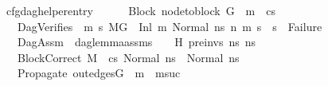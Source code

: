 \begin{isabellebody}
\isamarkupfalse%
%
\endisatagproof
{\isafoldproof}%
%
\isadelimproof
\isanewline
%
\endisadelimproof
\isanewline
{}\isamarkupfalse%
\ cfg{\isacharunderscore}{\kern0pt}dag{\isacharunderscore}{\kern0pt}helper{\isacharunderscore}{\kern0pt}entry{\isacharcolon}{\kern0pt}\isanewline
\ \ \isanewline
\ \ \ Block{\isacharcolon}{\kern0pt}\ {\isachardoublequoteopen}node{\isacharunderscore}{\kern0pt}to{\isacharunderscore}{\kern0pt}block\ G{}\ {\isacharbang}{\kern0pt}\ m{}\ {\isacharequal}{\kern0pt}\ cs{}{\isachardoublequoteclose}\ \isanewline
\ \ \ DagVerifies{\isacharcolon}{\kern0pt}\ {\isachardoublequoteopen}{\isasymAnd}\ m{}{\isacharprime}{\kern0pt}\ s{}{\isacharprime}{\kern0pt}{\isachardot}{\kern0pt}\ {\isacharparenleft}{\kern0pt}M{\isacharcomma}{\kern0pt}{\isasymLambda}{\isacharcomma}{\kern0pt}{\isasymGamma}{\isacharcomma}{\kern0pt}{\isasymOmega}{\isacharcomma}{\kern0pt}G{}\ {\isasymturnstile}\ {\isacharparenleft}{\kern0pt}Inl\ m{}{\isacharcomma}{\kern0pt}\ Normal\ ns{}{\isacharparenright}{\kern0pt}\ {\isacharminus}{\kern0pt}n{\isasymrightarrow}{\isacharasterisk}{\kern0pt}\ {\isacharparenleft}{\kern0pt}m{}{\isacharprime}{\kern0pt}{\isacharcomma}{\kern0pt}\ s{}{\isacharprime}{\kern0pt}{\isacharparenright}{\kern0pt}{\isacharparenright}{\kern0pt}\ {\isasymLongrightarrow}\ s{}{\isacharprime}{\kern0pt}\ {\isasymnoteq}\ Failure{\isachardoublequoteclose}\ \isanewline
\ \ \ DagAssm{\isacharcolon}{\kern0pt}\ \ {\isachardoublequoteopen}dag{\isacharunderscore}{\kern0pt}lemma{\isacharunderscore}{\kern0pt}assms\ {\isasymLambda}\ {\isasymGamma}\ {\isasymOmega}\ H\ pre{\isacharunderscore}{\kern0pt}invs\ ns{}\ ns{}{\isachardoublequoteclose}\ \isanewline
\ \ \ BlockCorrect{\isacharcolon}{\kern0pt}\ {\isachardoublequoteopen}M{\isacharcomma}{\kern0pt}{\isasymLambda}{\isacharcomma}{\kern0pt}{\isasymGamma}{\isacharcomma}{\kern0pt}{\isasymOmega}\ {\isasymturnstile}\ {\isasymlangle}cs{}{\isacharcomma}{\kern0pt}\ Normal\ ns{}{\isasymrangle}\ {\isacharbrackleft}{\kern0pt}{\isasymrightarrow}{\isacharbrackright}{\kern0pt}\ Normal\ ns{}{\isachardoublequoteclose}\ \isanewline
\ \ \ Propagate{}{\isacharcolon}{\kern0pt}\ {\isachardoublequoteopen}out{\isacharunderscore}{\kern0pt}edges{\isacharparenleft}{\kern0pt}G{}{\isacharparenright}{\kern0pt}\ {\isacharbang}{\kern0pt}\ m{}\ {\isacharequal}{\kern0pt}\ {\isacharbrackleft}{\kern0pt}m{}{\isacharunderscore}{\kern0pt}suc{\isacharbrackright}{\kern0pt}{\isachardoublequoteclose}\ \isanewline

\end{isabellebody}
